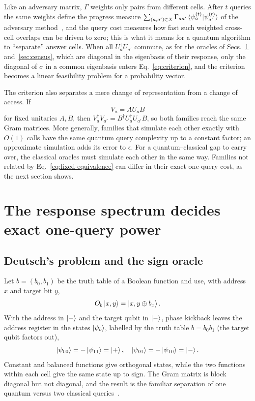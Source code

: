 \documentclass[
  aps,
  pra,
  reprint,
  nofootinbib
]{revtex4-2}
\begin{document}
Like an adversary matrix, \(\Gamma\) weights only pairs from different cells.
After \(t\) queries the same weights define the progress measure
\(\sum_{(a,a')\in X}\Gamma_{aa'}\braket{\psi_a^{(t)}|\psi_{a'}^{(t)}}\) of the
adversary method~\cite{Ambainis2002Adversary}, and the query cost measures how
fast such weighted cross-cell overlaps can be driven to zero; this is what it
means for a quantum algorithm to ``separate'' answer cells. When all
\(U_a^\dagger U_{a'}\) commute, as for the oracles of Secs.~\ref{sec:spectrum}
and~\ref{sec:census}, which are
diagonal in the eigenbasis of their response, only the diagonal of \(\sigma\)
in a common eigenbasis enters Eq.~\eqref{eq:criterion}, and the criterion
becomes a linear feasibility problem for a probability vector.

The criterion also separates a mere change of representation from a change of
access. If
\begin{equation}
 V_a=A U_a B
 \label{eq:fixed-equivalence}
\end{equation}
for fixed unitaries \(A,B\), then
\(V_a^\dagger V_{a'}=B^\dagger U_a^\dagger U_{a'}B\), so both families reach
the same Gram matrices. More generally, families that simulate each other
exactly with \(O(1)\) calls have the same quantum query complexity up to a
constant factor; an approximate simulation adds its error to \(\epsilon\). For
a quantum--classical gap to carry over, the classical oracles must simulate
each other in the same way. Families not related by
Eq.~\eqref{eq:fixed-equivalence} can differ in their exact one-query cost, as
the next section shows.

\section{The response spectrum decides exact one-query power}
\label{sec:spectrum}

\subsection{Deutsch's problem and the sign oracle}

Let \(b=(b_0,b_1)\) be the truth table of a Boolean function and use, with
address \(x\) and target bit \(y\),
\begin{equation}
 O_b\ket{x,y}=\ket{x,y\oplus b_x}.
 \label{eq:xor-oracle}
\end{equation}
With the address in \(\ket+\) and the target qubit in \(\ket-\), phase kickback
leaves the address register in the states \(\ket{\psi_b}\), labelled by the
truth table \(b=b_0b_1\) (the target qubit factors out),
\begin{equation}
 \ket{\psi_{00}} = -\ket{\psi_{11}} = \ket{+},\quad
 \ket{\psi_{01}} = -\ket{\psi_{10}} = \ket{-}.
 \label{eq:deutsch-rays}
\end{equation}
Constant and balanced functions give orthogonal states, while the two
functions within each cell give the same state up to sign. The Gram matrix is
block diagonal but not diagonal, and the result is the familiar separation of
one quantum versus two classical
queries~\cite{deutsch,deutsch:92,cleve:98}.
\end{document}
